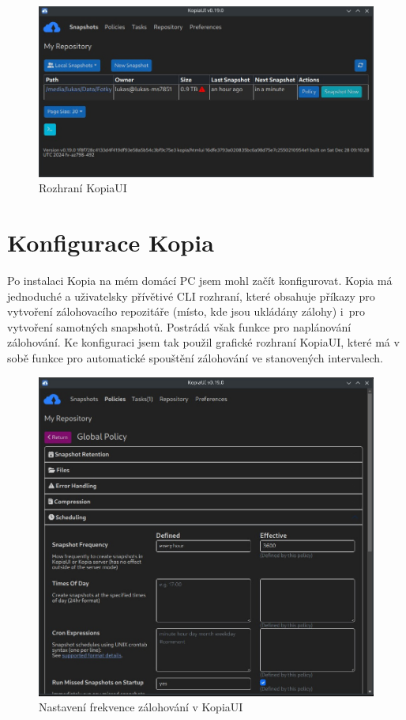 \documentclass[a4paper,12pt, oneside]{book}
\begin{document}
\begin{figure}[h]
\centering
\includegraphics[width=1\textwidth]{img/kopiaUI-Snapshots.jpg}
\caption{Rozhraní KopiaUI}
\end{figure}


\section{Konfigurace Kopia}

Po instalaci Kopia na mém domácí PC jsem mohl začít
konfigurovat. Kopia má jednoduché a uživatelsky přívětivé CLI rozhraní, které
obsahuje příkazy pro vytvoření zálohovacího repozitáře (místo, kde jsou ukládány
zálohy) i pro vytvoření samotných snapshotů. Postrádá však funkce pro
naplánování zálohování. Ke konfiguraci jsem tak použil grafické rozhraní
KopiaUI, které má v sobě funkce pro automatické spouštění zálohování ve
stanovených intervalech. 

\begin{figure}[h]
\centering
\includegraphics[width=1\textwidth]{img/kopiaUI-Policy.jpg}
\caption{Nastavení frekvence zálohování v KopiaUI}
\end{figure}
\end{document}
